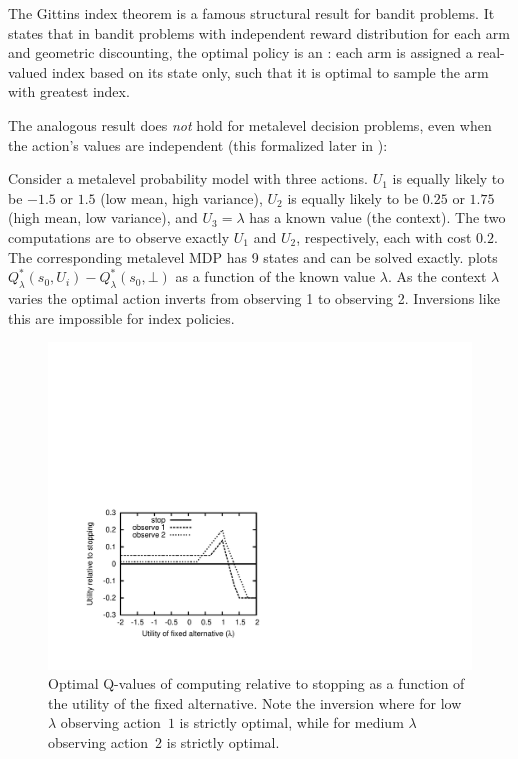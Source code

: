 

The Gittins index theorem \citep{Gittins:1979} is a famous structural
result for bandit problems.  It states that in bandit problems with
independent reward distribution for each arm and geometric discounting,
the optimal policy is an :  each arm is assigned a
real-valued index based on its state only, such that it is optimal to
sample the arm with greatest index.

The analogous result does \emph{not} hold for metalevel decision problems,
even when the action's values are independent (this formalized later in ):

\begin{example}
Consider a metalevel probability model with three actions. 
	$U_1$ is equally likely to be $-1.5$ or $1.5$ (low mean, high variance),
	$U_2$ is equally likely to be $0.25$ or $1.75$ (high mean, low variance),
	and $U_3=\lambda$ has a known value (the context).
The two computations are to observe exactly $U_1$ and $U_2$, respectively, each with cost $0.2$.
The corresponding metalevel MDP has 9 states and can be solved exactly.
 plots $Q^*_\lambda(s_0,U_i) - Q^*_\lambda(s_0,\bot)$ as a function of the known value $\lambda$.
As the context $\lambda$ varies the optimal action inverts from observing 1 to observing 2.
Inversions like this are impossible for index policies.
\end{example}

\begin{figure}[htb]
\centering
\includegraphics[scale=0.7, trim=90 70 400 300]{swap-counterex.pdf}
\caption{Optimal Q-values of computing relative to stopping as a function of the utility of the fixed alternative.  Note the inversion
where for low $\lambda$ observing action~$1$ is strictly optimal, while for medium $\lambda$ observing action~$2$ is strictly optimal.}
\label{fig:swap-counterex}
\end{figure}

